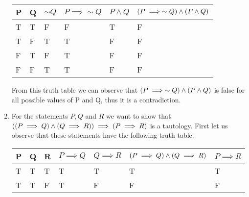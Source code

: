 \documentclass[12pt]{article}
\makeatletter
\newcommand*{\arabicodd}[1]{%
  \expandafter\@arabicodd\csname c@#1\endcsname
}
\newcommand*{\@arabicodd}[1]{%
  \@arabic{\numexpr(#1)*2-1\relax}%
}
\makeatother
\begin{document}
\begin{enumerate}[label=2.\arabicodd*, start=24]
        \hfill
        \hfill
        \linebreak
        \linebreak
        \begin{minipage}{\linewidth}
          \begin{tabular}{@{}llllll@{}}
            \toprule
            P & Q & $\sim Q$ & $P \implies \sim Q$ & $P \land Q$ & $\qty(P \implies \sim Q) \land \qty(P \land Q)$ \\ \midrule
            T & T & F        & F                   & T           & F                                               \\
            T & F & T        & T                   & F           & F                                               \\
            F & T & F        & T                   & F           & F                                               \\
            F & F & T        & T                   & F           & F                                               \\ \bottomrule
          \end{tabular}
        \end{minipage}
        \linebreak
        \linebreak
        From this truth table we can observe that $\qty(P \implies \sim Q) \land \qty(P \land Q)$ is
        false for all possible values of P and Q, thus it is a contradiction.
  \item
        For the statements $P, Q$ and $R$ we want to show that $\qty(\qty(P \implies Q) \land \qty(Q \implies R)) \implies \qty(P \implies R)$
        is a tautology. First let us observe that these statements have the following
        truth table.
        \hfill
        \hfill
        \hfill
        \linebreak
        \linebreak
        \begin{minipage}{\linewidth}
          \small
          \begin{tabular}{@{}lllllll@{}}
            \toprule
            P & Q & R & $P \implies Q$ & $Q \implies R$ & $\qty(P \implies Q) \land \qty(Q \implies R)$ & $P \implies R$ \\ \midrule
            T & T & T & T              & T              & T                                             & T              \\
            T & T & F & T              & F              & F                                             & F              \\

\end{tabular}
\end{minipage}
\end{enumerate}
\end{document}
